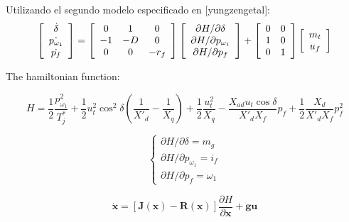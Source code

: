 Utilizando el segundo modelo especificado en [yungzengetal]:
\[
\left[
\begin{array}{c}
\dot{\delta}\\
\dot{p_{\omega_1}}\\
\dot{p_f}
\end{array}
\right]
=
\left[
\begin{array}{c c c}
0&1&0\\
-1&-D&0\\
0&0&-r_f
\end{array}
\right]
\left[
\begin{array}{c}
\partial H/\partial\delta\\
\partial H/\partial p_{\omega_1}\\
\partial H/\partial p_f
\end{array}
\right]
+
\left[
\begin{array}{c c}
0&0\\
1&0\\
0&1
\end{array}
\right]
\left[
\begin{array}{c}
m_t\\
u_f
\end{array}
\right]
\]

The hamiltonian function:

\[
H=\frac{1}{2}\frac{p_{\omega_1}^2}{T_j^*}+
\frac{1}{2}u_t^2 \cos^2{\delta}(\frac{1}{X'_d}-\frac{1}{X_q})+
\frac{1}{2}\frac{u_t^2}{X_q}-
\frac{X_{ad}u_t\cos{\delta}}{X'_dX_f}p_f+
\frac{1}{2}\frac{X_d}{X'_dX_f}p_f^2

\]

\[
\left\{
\begin{array}{c}
\partial H/\partial\delta=m_g\\
\partial H/\partial p_{\omega_1}=i_f\\
\partial H/\partial p_f=\omega_1
\end{array}

\]

\[
\mathbf{\dot{x}}=[\mathbf{J(x)}-\mathbf{R(x)}]\frac{\partial H}{\partial \mathbf{{x}}}+\mathbf{gu}
\]
